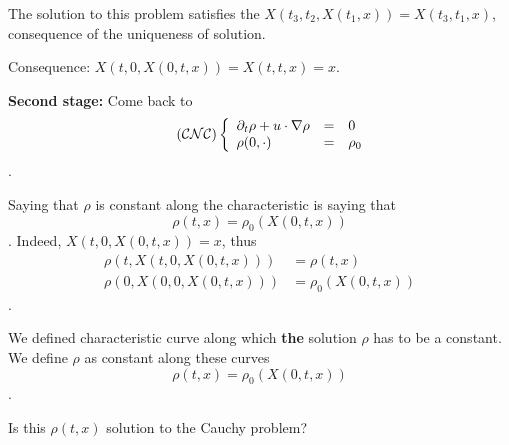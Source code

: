 \documentclass{report}
\newcommand*{\definition}[1]{\noindent\textbf{\color{cadmiumgreen}{#1}}}
\theoremstyle{plain}
\theoremstyle{definition}
\theoremstyle{remark}
\begin{document}
The solution to this problem satisfies the \definition{semi-group property}
$X(t_3,t_2,X(t_1,x)) = X(t_3,t_1,x)$, consequence of the uniqueness 
of solution.

Consequence: $X(t,0,X(0,t,x)) = X(t,t,x) = x$.

\textbf{Second stage:} Come back to 
\begin{equation}
	\tag{$\mathcal{CNC}$}
	\left\lbrace
	\begin{array}{lclc}
		\partial_t \rho + u\cdot\nabla \rho &=& 0 \\
		\rho(0,\cdot) &=& \rho_0 
	\end{array}
	\label{eq-cnc}
    \right.
\end{equation}.

Saying that $\rho$ is constant along the characteristic is saying that
$$\rho(t,x) = \rho_0(X(0,t,x))$$.
Indeed,  $X(t,0,X(0,t,x)) = x$, thus
\begin{align*}
	\rho(t,X(t,0,X(0,t,x))) & = \rho(t,x)\\
	\rho(0,X(0,0,X(0,t,x))) & = \rho_0(X(0,t,x))
\end{align*}.

We defined characteristic curve along which \textbf{the} solution
$\rho$ has to be a constant. We define $\rho$ as constant along these 
curves $$\rho(t,x) = \rho_0(X(0,t,x))$$.

Is this $\rho(t,x)$ solution to the Cauchy problem?
\end{document}
